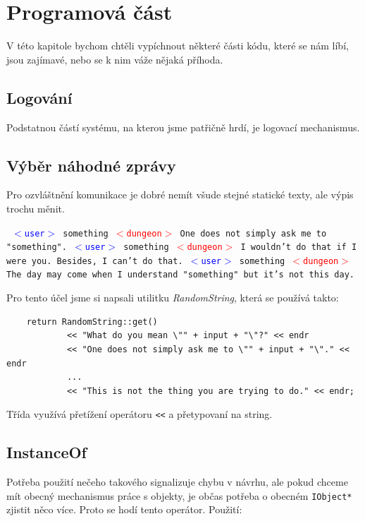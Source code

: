\documentclass[11pt, a4paper]{article}
\def\class#1{\emph{#1}}
\newenvironment{example}%
{\smallskip\noindent\ignorespaces\obeylines\tt}%
{\smallskip\par\noindent
\ignorespacesafterend}
\def\user{\textcolor{blue}{$<$user$>$ }}
\def\dung{\textcolor{red}{$<$dungeon$>$ }}
\begin{document}
\section{Programová část}

V této kapitole bychom chtěli vypíchnout některé části kódu, které se nám líbí, jsou zajímavé, nebo se k nim váže nějaká příhoda.

\subsection{Logování}

Podstatnou částí systému, na kterou jsme patřičně hrdí, je logovací mechanismus.


\subsection{Výběr náhodné zprávy}

Pro ozvláštnění komunikace je dobré nemít všude stejné statické texty, ale výpis trochu měnit.

\begin{example}
\user something
\dung One does not simply ask me to "something".
\user something
\dung I wouldn't do that if I were you. Besides, I can't do that.
\user something
\dung The day may come when I understand "something"{} but it's not 
this day.
\end{example}

\noindent Pro tento účel jsme si napsali utilitku \class{RandomString}, která se používá takto:

\begin{lstlisting}
	return RandomString::get()
		    << "What do you mean \"" + input + "\"?" << endr
		    << "One does not simply ask me to \"" + input + "\"." << endr
		    ...
			<< "This is not the thing you are trying to do." << endr;
\end{lstlisting}

\noindent Třída využívá přetížení operátoru \texttt{<<} a přetypovaní na string.

\subsection{InstanceOf}

Potřeba použití nečeho takového signalizuje chybu v návrhu, ale pokud chceme mít obecný mechanismus práce s objekty, je občas potřeba o obecném \texttt{IObject*} zjistit něco více. Proto se hodí tento operátor. Použití:
\end{document}
